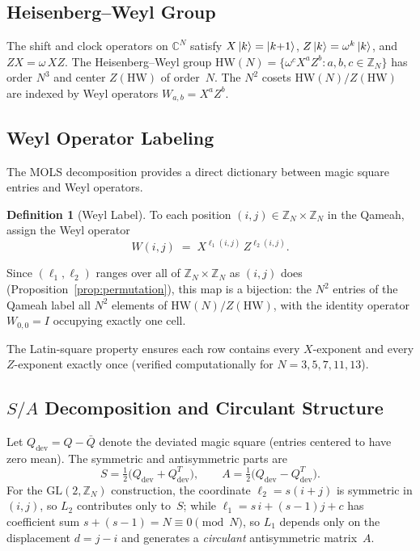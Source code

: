 \documentclass[aip,jmp,reprint,superscriptaddress,floatfix,nofootinbib]{revtex4-2}
\theoremstyle{definition}
\newtheorem{definition}[theorem]{Definition}
\theoremstyle{remark}
\newcommand{\ZN}{\mathbb{Z}_N}
\newcommand{\GL}{\mathrm{GL}}
\newcommand{\HW}{\mathrm{HW}}
\begin{document}
\subsection{Heisenberg--Weyl Group}
\label{sec:gl2:hw}

The shift and clock operators on $\mathbb{C}^N$ satisfy
$X\ket{k} = \ket{k{+}1}$, $Z\ket{k} = \omega^k\ket{k}$, and
$ZX = \omega\, XZ$.  The Heisenberg--Weyl group
$\HW(N) = \{\omega^c X^a Z^b : a,b,c \in \ZN\}$ has order $N^3$
and center $Z(\HW)$ of order~$N$.  The $N^2$ cosets
$\HW(N)/Z(\HW)$ are indexed by Weyl operators $W_{a,b} = X^a Z^b$.

\subsection{Weyl Operator Labeling}
\label{sec:gl2:weyl}

The MOLS decomposition provides a direct dictionary between magic
square entries and Weyl operators.

\begin{definition}[Weyl Label]\label{def:weyl-label}
To each position $(i,j) \in \ZN \times \ZN$ in the Qameah, assign
the Weyl operator
\begin{equation}\label{eq:weyl-label}
W(i,j) \;=\; X^{\ell_1(i,j)}\, Z^{\ell_2(i,j)}.
\end{equation}
\end{definition}

Since $(\ell_1, \ell_2)$ ranges over all of $\ZN \times \ZN$ as
$(i,j)$ does (Proposition~\ref{prop:permutation}), this map is a
bijection: the $N^2$ entries of the Qameah label all $N^2$ elements of
$\HW(N)/Z(\HW)$, with the identity operator $W_{0,0} = I$ occupying
exactly one cell.

The Latin-square property ensures each row contains every
$X$-exponent and every $Z$-exponent exactly once (verified
computationally for $N = 3, 5, 7, 11, 13$).

\subsection{\texorpdfstring{$S/A$}{S/A} Decomposition and Circulant Structure}
\label{sec:gl2:sa}

Let $Q_{\mathrm{dev}} = Q - \bar{Q}$ denote the deviated magic square
(entries centered to have zero mean).  The symmetric and antisymmetric
parts are
\begin{equation}\label{eq:SA-def}
S = \tfrac{1}{2}\bigl(Q_{\mathrm{dev}} + Q_{\mathrm{dev}}^T\bigr),
\qquad
A = \tfrac{1}{2}\bigl(Q_{\mathrm{dev}} - Q_{\mathrm{dev}}^T\bigr).
\end{equation}
For the $\GL(2,\ZN)$ construction, the coordinate $\ell_2 = s(i+j)$
is symmetric in $(i,j)$, so $L_2$ contributes only to~$S$; while
$\ell_1 = s\,i + (s{-}1)j + c$ has coefficient sum $s + (s{-}1) =
N \equiv 0 \pmod{N}$, so $L_1$ depends only on the displacement
$d = j - i$ and generates a \emph{circulant} antisymmetric matrix~$A$.
\end{document}
